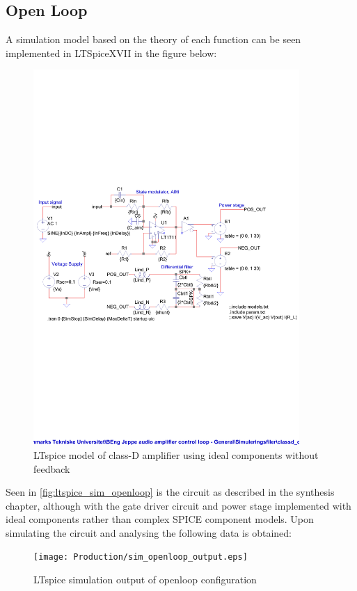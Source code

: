 \subsection{Open Loop}
A simulation model based on the theory of each function can be seen implemented in LTSpiceXVII in the figure below:
\begin{figure}[H]
	\centering
	\includegraphics[width=0.9\textwidth,trim=5 260 5 260, clip]{0_Figures/Production/ltspice_sim_openloop.pdf}
	\caption{LTspice model of class-D amplifier using ideal components without feedback}
	\label{fig:ltspice_sim_openloop}
\end{figure}
Seen in \autoref{fig:ltspice_sim_openloop} is the circuit as described in the synthesis chapter, although with the gate driver circuit and power stage implemented with ideal components rather than complex SPICE component models. Upon simulating the circuit and analysing the following data is obtained:
\begin{figure}[htbp]
	\centering
	\texttt{[image: Production/sim\_openloop\_output.eps]}
	\caption{LTspice simulation output of openloop configuration}
	\label{fig:ltspice_sim_openloop_output}
\end{figure}
